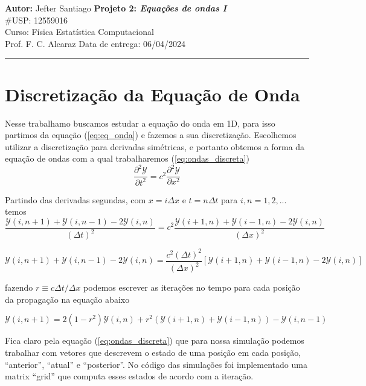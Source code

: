\documentclass[a4paper, 11pt]{tufte-handout}
\begin{document}
\begin{fullwidth}
\noindent
\large\textbf{Autor:} Jefter Santiago \hfill \textbf{Projeto 2: {\color{blue}\emph{Equações de ondas I}}}   \\
\#USP: 12559016 \\
\normalsize Curso: Física Estatística Computacional \\
Prof. F. C. Alcaraz \hfill Data de entrega: 06/04/2024\\
\noindent\rule{7in}{2.8pt}
\end{fullwidth}


\section{Discretização da Equação de Onda}
Nesse trabalhamo buscamos estudar a equação do onda em 1D, para isso partimos da equação
(\ref{eq:eq_onda}) e fazemos a sua discretização. Escolhemos utilizar a discretização para derivadas
simétricas, e portanto obtemos a forma da equação de ondas com a qual trabalharemos (\ref{eq:ondas_discreta})
\begin{equation}
  \frac{\partial^2 \mathcal{Y}}{\partial t^2} = c^2  \frac{\partial^2 \mathcal{Y}}{\partial x^2}
  \label{eq:eq_onda}
\end{equation}

Partindo das derivadas segundas, com \( x = i \Delta x \) e \( t = n \Delta t \) para \( i, n = 1, 2, ... \)  temos
\[  \frac{\mathcal{Y}(i, n+1) + \mathcal{Y}(i,n-1) - 2 \mathcal{Y}(i,n)}{(\Delta t)^2} = c^2 \frac{\mathcal{Y}(i+1,n) + \mathcal{Y}(i-1,n) -
    2\mathcal{Y}(i,n)}{(\Delta x)^2} \]

\[ \mathcal{Y}(i, n+1) + \mathcal{Y}(i,n-1) - 2 \mathcal{Y}(i,n) = \frac{c^2 (\Delta t)^2}{(\Delta x)^2} \left[ \mathcal{Y}(i+1, n) + \mathcal{Y}(i-1,n) - 2\mathcal{Y}(i,n) \right]  \]

fazendo  \( r \equiv  c \Delta t/\Delta x\) podemos escrever as iterações no tempo para cada posição da propagação
na equação abaixo

\begin{equation}
  \mathcal{Y}(i, n+1) = 2 \left( 1 - r^2 \right) \mathcal{Y}(i, n) + r^2 \left( \mathcal{Y}(i+1,n) + \mathcal{Y}(i-1,n) \right) - \mathcal{Y}(i,n-1)
  \label{eq:ondas_discreta}
\end{equation}


Fica claro pela equação (\ref{eq:ondas_discreta}) que para nossa simulação podemos trabalhar com 
vetores que descrevem o estado de uma posição em cada posição, ``anterior'', ``atual'' e
``posterior''. No código das simulações foi implementado uma matrix ``grid'' que computa esses
estados de acordo com a iteração.  
\end{document}
